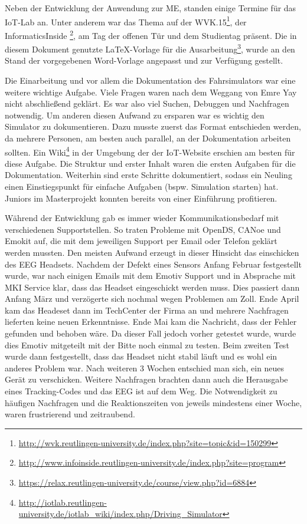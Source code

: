 \label{chap:master_project}
Neben der Entwicklung der Anwendung zur \acl{ME}, standen einige Termine für das IoT-Lab an. Unter anderem war das Thema auf der WVK.15\footnote{\url{http://wvk.reutlingen-university.de/index.php?site=topic&id=150299}}, der InformaticsInside \footnote{\url{http://www.infoinside.reutlingen-university.de/index.php?site=program}}, am Tag der offenen Tür und dem Studientag präsent. 
Die in diesem Dokument genutzte \LaTeX -Vorlage für die Ausarbeitung\footnote{\url{https://relax.reutlingen-university.de/course/view.php?id=6884}}, wurde an den Stand der vorgegebenen Word-Vorlage angepasst und zur Verfügung gestellt.

Die Einarbeitung und vor allem die Dokumentation des Fahrsimulators war eine weitere wichtige Aufgabe. Viele Fragen waren nach dem Weggang von Emre Yay nicht abschließend geklärt. Es war also viel Suchen, Debuggen und Nachfragen notwendig. Um anderen diesen Aufwand zu ersparen war es wichtig den Simulator zu dokumentieren. Dazu musste zuerst das Format entschieden werden, da mehrere Personen, am besten auch parallel, an der Dokumentation arbeiten sollten. Ein Wiki\footnote{\url{http://iotlab.reutlingen-university.de/iotlab_wiki/index.php/Driving_Simulator}} in der Umgebung der der IoT-Website erschien am besten für diese Aufgabe. Die Struktur und erster Inhalt waren die ersten Aufgaben für die Dokumentation. Weiterhin sind erste Schritte dokumentiert, sodass ein Neuling einen Einstiegspunkt für einfache Aufgaben (bspw. Simulation starten) hat. Juniors im Masterprojekt konnten bereits von einer Einführung profitieren.

Während der Entwicklung gab es immer wieder Kommunikationsbedarf mit verschiedenen Supportstellen. So traten Probleme mit OpenDS, CANoe und Emokit auf, die mit dem jeweiligen Support per Email oder Telefon geklärt werden mussten. Den meisten Aufwand erzeugt in dieser Hinsicht das einschicken des EEG Headsets. Nachdem der Defekt eines Sensors Anfang Februar festgestellt wurde, war nach einigen Emails mit dem Emotiv Support und in Absprache mit MKI Service klar, dass das Headset eingeschickt werden muss. Dies passiert dann Anfang März und verzögerte sich nochmal wegen Problemen am Zoll. Ende April kam das Headeset dann im TechCenter der Firma an und mehrere Nachfragen lieferten keine neuen Erkenntnisse. Ende Mai kam die Nachricht, dass der Fehler gefunden und behoben wäre. Da dieser Fall jedoch vorher getestet wurde, wurde dies Emotiv mitgeteilt mit der Bitte noch einmal zu testen. Beim zweiten Test wurde dann festgestellt, dass das Headset nicht stabil läuft und es wohl ein anderes Problem war. Nach weiteren 3 Wochen entschied man sich, ein neues Gerät zu verschicken. Weitere Nachfragen brachten dann auch die Herausgabe eines Tracking-Codes und das EEG ist auf dem Weg. Die Notwendigkeit zu häufigen Nachfragen und die Reaktionszeiten von jeweils mindestens einer Woche, waren frustrierend und zeitraubend.
